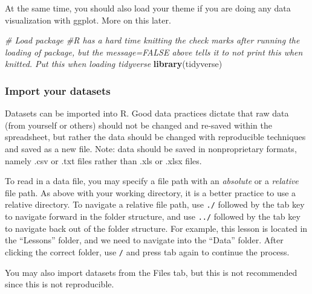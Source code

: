 \documentclass[]{article}
\newenvironment{Shaded}{\begin{snugshade}}{\end{snugshade}}
\newcommand{\CommentTok}[1]{\textcolor[rgb]{0.56,0.35,0.01}{\textit{#1}}}
\newcommand{\KeywordTok}[1]{\textcolor[rgb]{0.13,0.29,0.53}{\textbf{#1}}}
\newcommand{\NormalTok}[1]{#1}
\begin{document}
At the same time, you should also load your theme if you are doing any
data visualization with ggplot. More on this later.

\begin{Shaded}
\begin{Highlighting}[]
\CommentTok{# Load package #R has a hard time knitting the check marks after running the loading of package, but the message=FALSE above tells it to not print this when knitted. Put this when loading tidyverse}
\KeywordTok{library}\NormalTok{(tidyverse)}
\end{Highlighting}
\end{Shaded}

\hypertarget{import-your-datasets}{%
\subsubsection{Import your datasets}\label{import-your-datasets}}

Datasets can be imported into R. Good data practices dictate that raw
data (from yourself or others) should not be changed and re-saved within
the spreadsheet, but rather the data should be changed with reproducible
techniques and saved as a new file. Note: data should be saved in
nonproprietary formats, namely .csv or .txt files rather than .xls or
.xlsx files.

To read in a data file, you may specify a file path with an
\emph{absolute} or a \emph{relative} file path. As above with your
working directory, it is a better practice to use a relative directory.
To navigate a relative file path, use \texttt{./} followed by the tab
key to navigate forward in the folder structure, and use \texttt{../}
followed by the tab key to navigate back out of the folder structure.
For example, this lesson is located in the ``Lessons'' folder, and we
need to navigate into the ``Data'' folder. After clicking the correct
folder, use \texttt{/} and press tab again to continue the process.

You may also import datasets from the Files tab, but this is not
recommended since this is not reproducible.
\end{document}
